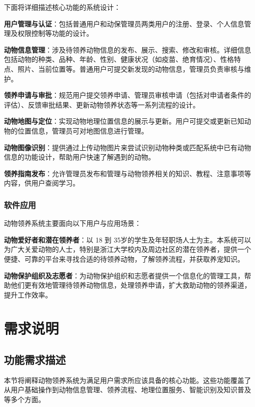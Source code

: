 \documentclass[12pt,a4paper,UTF8]{article}
\begin{document}
下面将详细描述核心功能的系统设计：

\vspace{0.25cm}

\textbf{用户管理与认证}：包括普通用户和动保管理员两类用户的注册、登录、个人信息管理及权限控制等功能的设计。

\textbf{动物信息管理}：涉及待领养动物信息的发布、展示、搜索、修改和审核。详细信息包括动物的种类、品种、年龄、性别、健康状况（如疫苗、绝育情况）、性格特点、照片、当前位置等。普通用户可提交新发现的动物信息，管理员负责审核与维护。

\textbf{领养申请与审批}：规范用户提交领养申请、管理员审核申请（包括对申请者条件的评估）、反馈审批结果、更新动物领养状态等一系列流程的设计。

\textbf{动物地图与定位}：实现动物地理位置信息的展示与更新。用户可提交或更新已知动物的位置信息，管理员可对地图信息进行管理。

\textbf{动物图像识别}：提供通过上传动物图片来尝试识别动物种类或匹配系统中已有动物信息的功能设计，帮助用户快速了解遇到的动物。

\textbf{领养指南发布}：允许管理员发布和管理与动物领养相关的知识、教程、注意事项等内容，供用户查阅学习。

\subsubsection{软件应用}

动物领养系统主要面向以下用户与应用场景：

\vspace{0.25cm}

\textbf{动物爱好者和潜在领养者}：以 18 到 35岁的学生及年轻职场人士为主。本系统可以为广大关爱动物的人士，特别是浙江大学校内及周边社区的潜在领养者，提供一个便捷、可靠的平台来寻找合适的待领养动物，了解领养流程，并获取养宠知识。

\textbf{动物保护组织及志愿者}：为动物保护组织和志愿者提供一个信息化的管理工具，帮助他们更有效地管理待领养动物信息，处理领养申请，扩大救助动物的领养渠道，提升工作效率。

\section{需求说明}

\subsection{功能需求描述}

本节将阐释动物领养系统为满足用户需求所应该具备的核心功能。这些功能覆盖了从用户基础操作到动物信息管理、领养流程、地理位置服务、智能识别及知识普及等多个方面。
\end{document}
